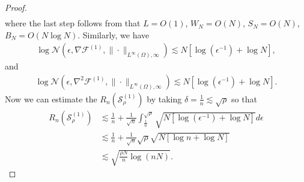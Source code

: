 \documentclass{article}
\newcommand{\F}{\mathcal{F}}
\newcommand{\N}{\mathcal{N}}
\theoremstyle{plain}
\theoremstyle{definition}
\theoremstyle{remark}
\begin{document}
\begin{proof}
\begin{align*}
        \end{align*}
        where the last step follows from that $L = O(1)$, $W_N = O(N)$, $S_N = O(N)$, $B_N = O(N \log N)$. Similarly, we have
        \begin{align*}
            \log \N(\epsilon, \nabla \F^{(1)}, \|\cdot\|_{L^\infty(\Omega), \infty}) \lesssim N \left[\log (\epsilon^{-1}) + \log N \right], 
        \end{align*}
        and 
        \begin{align*}
            \log \N(\epsilon, \nabla^2 \F^{(1)}, \|\cdot\|_{L^\infty(\Omega),\infty}) \lesssim N \left[\log (\epsilon^{-1}) + \log N \right].
        \end{align*}
        Now we can estimate the $R_{n}(\mathcal{S}_\rho^{(1)})$ by taking $\delta = \frac{1}{n} \lesssim \sqrt{\rho}$ so that
        \begin{align*}
            R_{n}(\mathcal{S}_\rho^{(1)}) & \lesssim  \frac{1}{n} + \frac{1}{\sqrt{n}} \int_{\frac{1}{n}}^{\sqrt{\rho}} 
            \sqrt{N [\log(\epsilon^{-1}) + \log N]} d\epsilon \\ & \lesssim \frac{1}{n} + \frac{1}{\sqrt{n}} \sqrt{\rho} \sqrt{N [\log n + \log N]} \\
            & \lesssim \sqrt{\frac{\rho N}{n} \log(n N)}.
        \end{align*}
    \end{proof}
\end{document}
